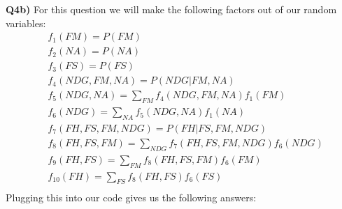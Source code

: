 \documentclass{article}
\begin{document}
\begin{titlepage}
\begin{center}
\end{center}
\textbf{Q4b)} For this question we will make the following factors out of our random variables:
\begin{align*}
& f_1(FM) = P(FM) \\ 
& f_2(NA) = P(NA) \\
& f_3(FS) = P(FS) \\
& f_4(NDG, FM, NA) = P(NDG | FM, NA) \\
& f_5(NDG, NA) = \sum_{FM} f_4(NDG, FM, NA)f_1(FM)  \\
& f_6(NDG) = \sum_{NA} f_5(NDG, NA)f_1(NA) \\
& f_7(FH, FS, FM, NDG) = P(FH | FS, FM, NDG) \\
& f_8(FH, FS, FM) = \sum_{NDG} f_7(FH, FS, FM, NDG)f_6(NDG)  \\
& f_9(FH, FS) = \sum_{FM} f_8(FH, FS, FM)f_6(FM) \\
& f_{10}(FH) = \sum_{FS} f_8(FH, FS)f_6(FS) \\
\end{align*}
Plugging this into our code gives us the following answers:

\end{titlepage}
\end{document}
